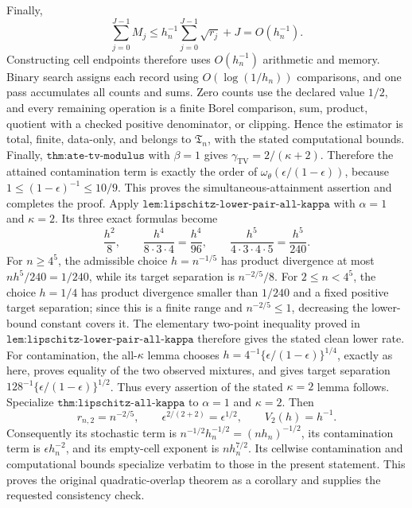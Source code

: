Finally,
\[
\sum_{j=0}^{J-1}M_j
\leq h_n^{-1}\sum_{j=0}^{J-1}\sqrt{r_j}+J
=O(h_n^{-1}).
\]
Constructing cell endpoints therefore uses \(O(h_n^{-1})\) arithmetic and memory. Binary search assigns each record using \(O(\log(1/h_n))\) comparisons, and one pass accumulates all counts and sums. Zero counts use the declared value \(1/2\), and every remaining operation is a finite Borel comparison, sum, product, quotient with a checked positive denominator, or clipping. Hence the estimator is total, finite, data-only, and belongs to \(\mathfrak T_n\), with the stated computational bounds. Finally, \(\texttt{thm:ate-tv-modulus}\) with \(\beta=1\) gives \(\gamma_{\mathrm{TV}}=2/(\kappa+2)\). Therefore the attained contamination term is exactly the order of \(\omega_\theta(\epsilon/(1-\epsilon))\), because \(1\leq(1-\epsilon)^{-1}\leq10/9\). This proves the simultaneous-attainment assertion and completes the proof.
Apply \(\texttt{lem:lipschitz-lower-pair-all-kappa}\) with \(\alpha=1\) and \(\kappa=2\). Its three exact formulas become
\[
\frac{h^2}{8},
\qquad
\frac{h^4}{8\cdot3\cdot4}=\frac{h^4}{96},
\qquad
\frac{h^5}{4\cdot3\cdot4\cdot5}=\frac{h^5}{240}.
\]
For \(n\geq4^5\), the admissible choice \(h=n^{-1/5}\) has product divergence at most \(n h^5/240=1/240\), while its target separation is \(n^{-2/5}/8\). For \(2\leq n<4^5\), the choice \(h=1/4\) has product divergence smaller than \(1/240\) and a fixed positive target separation; since this is a finite range and \(n^{-2/5}\leq1\), decreasing the lower-bound constant covers it. The elementary two-point inequality proved in \(\texttt{lem:lipschitz-lower-pair-all-kappa}\) therefore gives the stated clean lower rate. For contamination, the all-\(\kappa\) lemma chooses \(h=4^{-1}\{\epsilon/(1-\epsilon)\}^{1/4}\), exactly as here, proves equality of the two observed mixtures, and gives target separation \(128^{-1}\{\epsilon/(1-\epsilon)\}^{1/2}\). Thus every assertion of the stated \(\kappa=2\) lemma follows.
Specialize \(\texttt{thm:lipschitz-all-kappa}\) to \(\alpha=1\) and \(\kappa=2\). Then
\[
r_{n,2}=n^{-2/5},
\qquad
\epsilon^{2/(2+2)}=\epsilon^{1/2},
\qquad
V_2(h)=h^{-1}.
\]
Consequently its stochastic term is \(n^{-1/2}h_n^{-1/2}=(nh_n)^{-1/2}\), its contamination term is \(\epsilon h_n^{-2}\), and its empty-cell exponent is \(nh_n^{7/2}\). Its cellwise contamination and computational bounds specialize verbatim to those in the present statement. This proves the original quadratic-overlap theorem as a corollary and supplies the requested consistency check.
